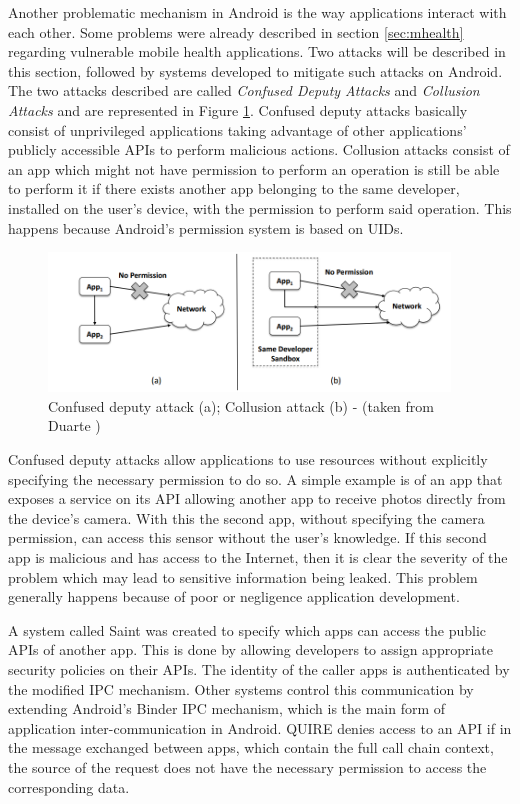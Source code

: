 Another problematic mechanism in Android is the way applications interact with each other. Some problems were already described in section \ref{sec:mhealth} regarding vulnerable mobile health applications. Two attacks will be described in this section, followed by systems developed to mitigate such attacks on Android. The two attacks described are called \emph{Confused Deputy Attacks} and \emph{Collusion Attacks} and are represented in Figure \ref{fig:communicationattacks}. Confused deputy attacks basically consist of unprivileged applications taking advantage of other applications’ publicly accessible APIs to perform malicious actions. Collusion attacks consist of an app which might not have permission to perform an operation is still be able to perform it if there exists another app belonging to the same developer, installed on the user’s device, with the permission to perform said operation. This happens because Android’s permission system is based on UIDs.

\begin{figure}[t!]
	\centering
	\includegraphics[width=0.95\textwidth]{img/communicationattacks.png}
	\caption{Confused deputy attack (a); Collusion attack (b) - (taken from Duarte \cite{nunoduarte})}
	\label{fig:communicationattacks}
\end{figure}

Confused deputy attacks allow applications to use resources without explicitly specifying the necessary permission to do so. A simple example is of an app that exposes a service on its API allowing another app to receive photos directly from the device's camera. With this the second app, without specifying the camera permission, can access this sensor without the user's knowledge. If this second app is malicious and has access to the Internet, then it is clear the severity of the problem which may lead to sensitive information being leaked. This problem generally happens because of poor or negligence application development.

A system  called Saint \cite{ongtang2012semantically} was created to specify which apps can access the public APIs of another app. This is done by allowing developers to assign appropriate security policies on their APIs. The identity of the caller apps is authenticated by the modified IPC mechanism. Other systems control this communication by extending Android’s Binder IPC mechanism, which is the main form of application inter-communication in Android. QUIRE \cite{dietz2011quire} denies access to an API if in the message exchanged between apps, which contain the full call chain context, the source of the request does not have the necessary permission to access the corresponding data.

